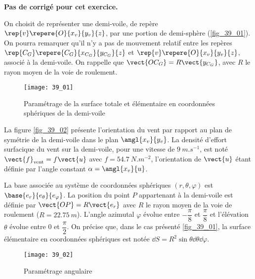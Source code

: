 \normaltrue \difficilefalse \tdifficilefalse
\correctionfalse


\setcounter{question}{0}
\ifcorrection
\else
\textbf{Pas de corrigé pour cet exercice.}
\fi

\ifprof
\else
On choisit de représenter une demi-voile, de repère $\rep{v}\repere{O}{x_v}{y_v}{z}$, par une portion de demi-sphère (\autoref{fig_39_01}).
On pourra remarquer qu’il n’y a pas de mouvement relatif entre les repères $\rep{C_G}\repere{C_G}{x_{C_G}}{y_{C_G}}{z}$ et $\rep{v}\repere{O}{x_v}{y_v}{z}$, 
associé à la demi-voile. On rappelle que $\vect{OC_G}=R\vect{y_{C_G}}$, avec $R$ le rayon moyen de la voie de roulement.


\begin{figure}[H]
\centering
\texttt{[image: 39\_01]}
\caption{Paramétrage de la surface totale et élémentaire en coordonnées sphériques de la demi-voile \label{fig_39_01}}
\end{figure}

La figure \autoref{fig_39_02} présente l’orientation du vent par rapport au plan de symétrie de la demi-voile dans le plan $\angl{x_v}{y_v}$. La densité d’effort surfacique du vent sur la demi-voile, pour une vitesse de $\SI{9}{m.s^{-1}}$, est noté $\vect{f}_{\text{vent}}=f\vect{u}$ avec $f=\SI{54,7}{N.m^{-2}}$, l’orientation de $\vect{u}$ étant définie par l’angle constant $\alpha=\angl{x_v}{u}$.

La base associée au système de coordonnées sphériques $\left(r,\theta,\varphi\right)$ est $\base{e_r}{e_{\theta}}{e_{\varphi}}$. La position du point $P$ appartenant
à la demi-voile est définie par $\vect{OP}=R\vect{e_r}$ avec $R$ le rayon moyen de la voie de roulement ($R=\SI{22,75}{m}$).
L’angle azimutal $\varphi$ évolue entre $-\dfrac{\pi}{8}$ et $\dfrac{\pi}{8}$ et l’élévation $\theta$ évolue entre 0 et $\dfrac{\pi}{2}$.
On précise que, dans le cas présenté \autoref{fig_39_01}, la surface élémentaire en coordonnées sphériques est notée
$\dd S =R^2 \sin \theta \dd\theta \dd \varphi$.


\begin{figure}[H]
\centering
\texttt{[image: 39\_02]}
\caption{Paramétrage angulaire \label{fig_39_02}}
\end{figure}

